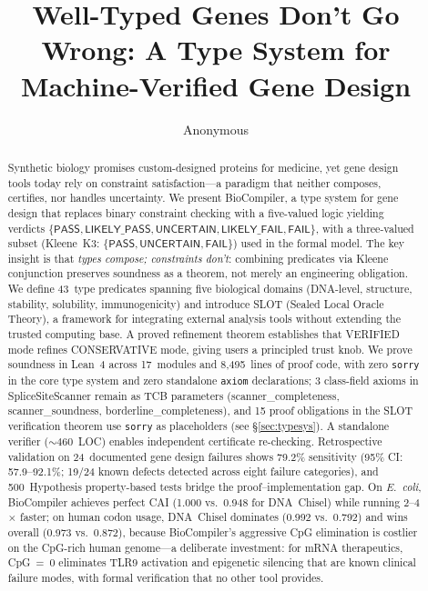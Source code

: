 \documentclass[acmsmall,review,anonymous]{acmart}
\title{Well-Typed Genes Don't Go Wrong: A Type System for Machine-Verified Gene Design}
\author{Anonymous}
\affiliation{Anonymous Institution}
\newcommand{\PASS}{\ensuremath{\mathsf{PASS}}\xspace}
\newcommand{\FAIL}{\ensuremath{\mathsf{FAIL}}\xspace}
\newcommand{\UNCERTAIN}{\ensuremath{\mathsf{UNCERTAIN}}\xspace}
\newcommand{\LIKELYPASS}{\ensuremath{\mathsf{LIKELY\_PASS}}\xspace}
\newcommand{\LIKELYFAIL}{\ensuremath{\mathsf{LIKELY\_FAIL}}\xspace}
\begin{document}
\begin{abstract}
Synthetic biology promises custom-designed proteins for medicine, yet gene design tools today rely on constraint satisfaction---a paradigm that neither composes, certifies, nor handles uncertainty. We present BioCompiler, a type system for gene design that replaces binary constraint checking with a five-valued logic yielding verdicts $\{\PASS, \LIKELYPASS, \UNCERTAIN, \LIKELYFAIL, \FAIL\}$, with a three-valued subset (Kleene~K3: $\{\PASS, \UNCERTAIN, \FAIL\}$) used in the formal model. The key insight is that \emph{types compose; constraints don't}: combining predicates via Kleene conjunction preserves soundness as a theorem, not merely an engineering obligation. We define 43~type predicates spanning five biological domains (DNA-level, structure, stability, solubility, immunogenicity) and introduce SLOT (Sealed Local Oracle Theory), a framework for integrating external analysis tools without extending the trusted computing base. A proved refinement theorem establishes that VERIFIED mode refines CONSERVATIVE mode, giving users a principled trust knob. We prove soundness in Lean~4 across 17~modules and 8,495~lines of proof code, with zero \texttt{sorry} in the core type system and zero standalone \texttt{axiom} declarations; 3 class-field axioms in SpliceSiteScanner remain as TCB parameters (scanner\_completeness, scanner\_soundness, borderline\_completeness), and 15 proof obligations in the SLOT verification theorem use \texttt{sorry} as placeholders (see \S\ref{sec:typesys}). A standalone verifier (${\sim}460$~LOC) enables independent certificate re-checking. Retrospective validation on 24~documented gene design failures shows 79.2\% sensitivity (95\% CI: 57.9--92.1\%; 19/24 known defects detected across eight failure categories), and 500~Hypothesis property-based tests bridge the proof--implementation gap. On \textit{E.~coli}, BioCompiler achieves perfect CAI (1.000 vs.~0.948 for DNA~Chisel) while running 2--4$\times$ faster; on human codon usage, DNA~Chisel dominates (0.992 vs.~0.792) and wins overall (0.973 vs.~0.872), because BioCompiler's aggressive CpG elimination is costlier on the CpG-rich human genome---a deliberate investment: for mRNA therapeutics, CpG~=~0 eliminates TLR9 activation and epigenetic silencing that are known clinical failure modes, with formal verification that no other tool provides.
\end{abstract}
\maketitle
\end{document}
